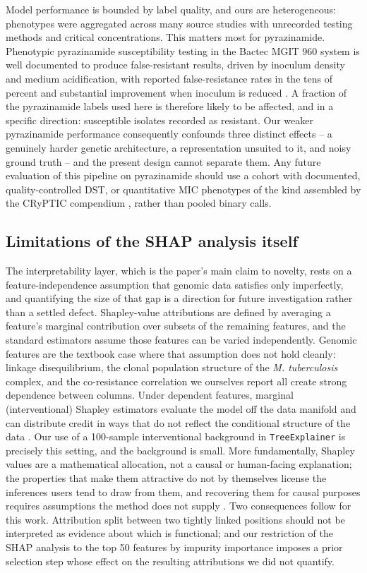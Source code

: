 Model performance is bounded by label quality, and ours are heterogeneous: phenotypes were aggregated across many source studies with unrecorded testing methods and critical concentrations. This matters most for pyrazinamide. Phenotypic pyrazinamide susceptibility testing in the Bactec MGIT 960 system is well documented to produce false-resistant results, driven by inoculum density and medium acidification, with reported false-resistance rates in the tens of percent and substantial improvement when inoculum is reduced \cite{mok2021pza,mustazzolu2019revisiting}. A fraction of the pyrazinamide labels used here is therefore likely to be affected, and in a specific direction: susceptible isolates recorded as resistant. Our weaker pyrazinamide performance consequently confounds three distinct effects -- a genuinely harder genetic architecture, a representation unsuited to it, and noisy ground truth -- and the present design cannot separate them. Any future evaluation of this pipeline on pyrazinamide should use a cohort with documented, quality-controlled DST, or quantitative MIC phenotypes of the kind assembled by the CRyPTIC compendium \cite{cryptic2022compendium}, rather than pooled binary calls.

\subsection{Limitations of the SHAP analysis itself}

The interpretability layer, which is the paper's main claim to novelty, rests on a feature-independence assumption that genomic data satisfies only imperfectly, and quantifying the size of that gap is a direction for future investigation rather than a settled defect. Shapley-value attributions are defined by averaging a feature's marginal contribution over subsets of the remaining features, and the standard estimators assume those features can be varied independently. Genomic features are the textbook case where that assumption does not hold cleanly: linkage disequilibrium, the clonal population structure of the \emph{M. tuberculosis} complex, and the co-resistance correlation we ourselves report all create strong dependence between columns. Under dependent features, marginal (interventional) Shapley estimators evaluate the model off the data manifold and can distribute credit in ways that do not reflect the conditional structure of the data \cite{aas2021explaining}. Our use of a 100-sample interventional background in \texttt{TreeExplainer} is precisely this setting, and the background is small. More fundamentally, Shapley values are a mathematical allocation, not a causal or human-facing explanation; the properties that make them attractive do not by themselves license the inferences users tend to draw from them, and recovering them for causal purposes requires assumptions the method does not supply \cite{kumar2020problems}. Two consequences follow for this work. Attribution split between two tightly linked positions should not be interpreted as evidence about which is functional; and our restriction of the SHAP analysis to the top 50 features by impurity importance imposes a prior selection step whose effect on the resulting attributions we did not quantify.

